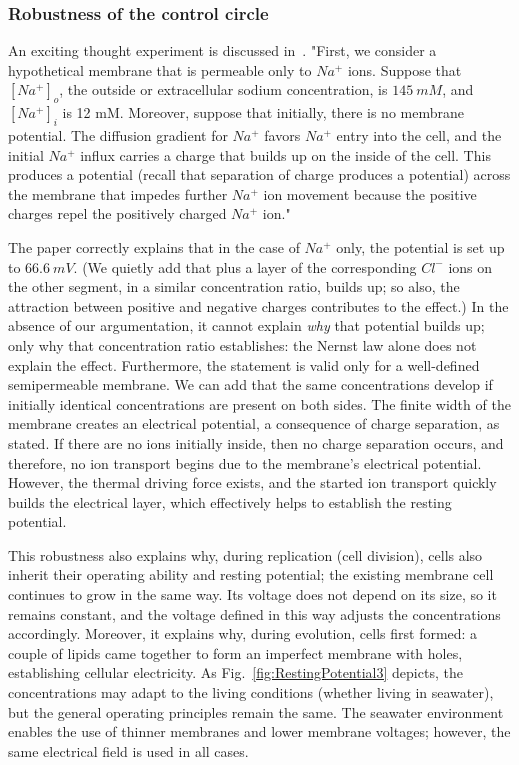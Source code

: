 \subsubsection{Robustness of the control circle}

An exciting thought experiment is discussed in~\cite{OriginMembranePotential:2017}. "First, we consider a hypothetical membrane that is permeable only to $Na^+$ ions. Suppose that $[Na^+]_o$, the outside or extracellular sodium concentration, is $145\ mM$, and $[Na^+]_i$ is 12 mM. Moreover, suppose that initially, there is no membrane potential. The diffusion gradient for $Na^+$ favors $Na^+$ entry into the cell, and the initial $Na^+$ influx carries a charge that builds up on the inside of the cell. This produces a potential (recall that separation of charge produces a potential) across the membrane that impedes further $Na^+$ ion movement because the positive charges repel the positively charged $Na^+$ ion."

The paper correctly explains that in the case of $Na^+$ only, the potential is set up
to $66.6\ mV$. (We quietly add that plus a layer of the corresponding $Cl^-$ ions on the other segment, in a similar concentration ratio, builds up; so also, the attraction between positive and negative charges contributes to the effect.) 
In the absence of our argumentation, it cannot explain \textit{why} 
that potential builds up; only why that concentration ratio
establishes: the Nernst law alone does not explain the effect. Furthermore, the statement is valid only for
a well-defined semipermeable membrane.
We can add that the same concentrations develop if initially identical concentrations
are present on both sides. 
The finite width of the membrane creates an electrical potential, a consequence of charge separation, as stated. 
If there are no ions initially inside, then no charge separation occurs, and therefore, no ion transport begins due to the membrane's electrical potential. However, the thermal driving force exists, and the started ion transport quickly builds the electrical layer, which effectively helps to establish the resting potential. 

This robustness also explains why, during replication (cell division), cells also inherit their operating ability and resting potential; the existing membrane cell continues to grow in the same way. Its voltage does not depend on its size, so it remains constant, and the voltage defined in this way adjusts the concentrations accordingly. Moreover, it explains why, during evolution, cells first formed: a couple of lipids came together to form an imperfect membrane with holes, establishing cellular electricity. As Fig.~\ref{fig:RestingPotential3} depicts, the concentrations may adapt to the living conditions (whether living in seawater), but the general operating principles remain the same. The seawater environment 
enables the use of thinner membranes and lower membrane voltages; however, the same electrical field is used in all cases.

